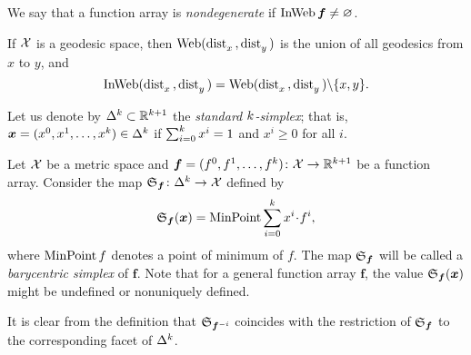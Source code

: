 We say that a function array is \emph{nondegenerate} 
if $\mathop{\rm InWeb}\nolimits\bm{f}\ne \varnothing$.

If $\mathcal{X}$ is a geodesic space, 
then $\mathop{\rm Web}\nolimits(\mathop{\rm dist}\nolimits_{x}^{{}}{}{},\mathop{\rm dist}\nolimits_{y}^{{}}{}{})$ is the union of all geodesics from $x$ to $y$, and 
\[\mathop{\rm InWeb}\nolimits(\mathop{\rm dist}\nolimits_{x}^{{}}{}{},\mathop{\rm dist}\nolimits_{y}^{{}}{}{})=\mathop{\rm Web}\nolimits(\mathop{\rm dist}\nolimits_{x}^{{}}{}{},\mathop{\rm dist}\nolimits_{y}^{{}}{}{})\backslash\{x,y\}.\]

Let us denote by $\Delta^\kay\subset \RR^{\kay+1}$ 
the \emph{standard $k$-simplex}; 
that is, $\bm{x}=(x^0,x^1,\dots,x^\kay)\in\Delta^\kay$ if $\sum_{i=0}^k x^i=1$ and $x^i\ge0$ for all $i$.

Let $\mathcal{X}$ be a metric space 
and $\bm{f}=(f^0,f^1,\dots,f^\kay)\:\spc{X}\to \RR^{\kay+1}$ be a function array.
Consider the map $\spx{\bm{f}}\:\Delta^\kay\to \spc{X}$ defined by 
\[\spx{\bm{f}}(\bm{x})=\argmin\sum_{i=0}^\kay x^i\cdot f^i,\]
where $\mathop{\rm MinPoint} f$\index{$\argmin$} denotes a point of minimum of $f$.
The map $\mathfrak{S}_{\bm{f}}$ will be called a \emph{barycentric simplex} of $\bm{f}$.
Note that for a general function array $\bm{f}$, 
the value $\mathfrak{S}_{\bm{f}}(\bm{x})$ might be undefined or nonuniquely defined.

It is clear from the definition that $\mathfrak{S}_{\bm{f}^{{-} i}}$ 
coincides with the restriction of $\mathfrak{S}_{\bm{f}}$ to the corresponding facet of $\Delta^k$.


